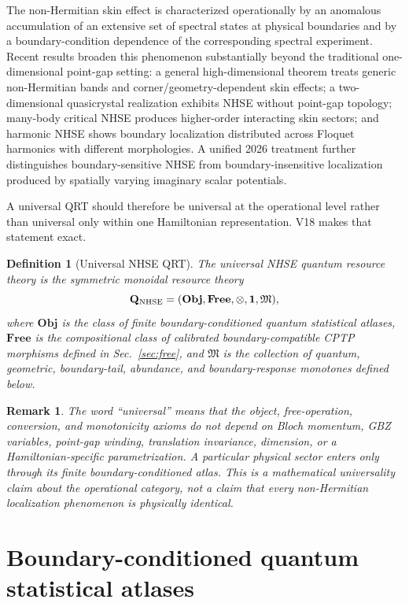 \documentclass[11pt]{article}
\newtheorem{definition}{Definition}
\newtheorem{remark}{Remark}
\newcommand{\Obj}{\mathbf{Obj}}
\newcommand{\Free}{\mathbf{Free}}
\begin{document}
The non-Hermitian skin effect is characterized operationally by an anomalous accumulation of an extensive set of spectral states at physical boundaries and by a boundary-condition dependence of the corresponding spectral experiment. Recent results broaden this phenomenon substantially beyond the traditional one-dimensional point-gap setting: a general high-dimensional theorem treats generic non-Hermitian bands and corner/geometry-dependent skin effects; a two-dimensional quasicrystal realization exhibits NHSE without point-gap topology; many-body critical NHSE produces higher-order interacting skin sectors; and harmonic NHSE shows boundary localization distributed across Floquet harmonics with different morphologies. \cite{Universal2D,QuasicrystalNHSE,ManyBodyCritical,HarmonicNHSE} A unified 2026 treatment further distinguishes boundary-sensitive NHSE from boundary-insensitive localization produced by spatially varying imaginary scalar potentials. \cite{BoundaryInsensitive}

A universal QRT should therefore be universal at the operational level rather than universal only within one Hamiltonian representation. V18 makes that statement exact.

\begin{definition}[Universal NHSE QRT]
The universal NHSE quantum resource theory is the symmetric monoidal resource theory
\[
\mathbf Q_{\rm NHSE}
=
(\Obj,\Free,\otimes,\mathbf 1,\mathfrak M),
\]
where \(\Obj\) is the class of finite boundary-conditioned quantum statistical atlases, \(\Free\) is the compositional class of calibrated boundary-compatible CPTP morphisms defined in Sec.~\ref{sec:free}, and \(\mathfrak M\) is the collection of quantum, geometric, boundary-tail, abundance, and boundary-response monotones defined below.
\end{definition}

\begin{remark}
The word ``universal'' means that the object, free-operation, conversion, and monotonicity axioms do not depend on Bloch momentum, GBZ variables, point-gap winding, translation invariance, dimension, or a Hamiltonian-specific parametrization. A particular physical sector enters only through its finite boundary-conditioned atlas. This is a mathematical universality claim about the operational category, not a claim that every non-Hermitian localization phenomenon is physically identical.
\end{remark}

\section{Boundary-conditioned quantum statistical atlases}
\end{document}
